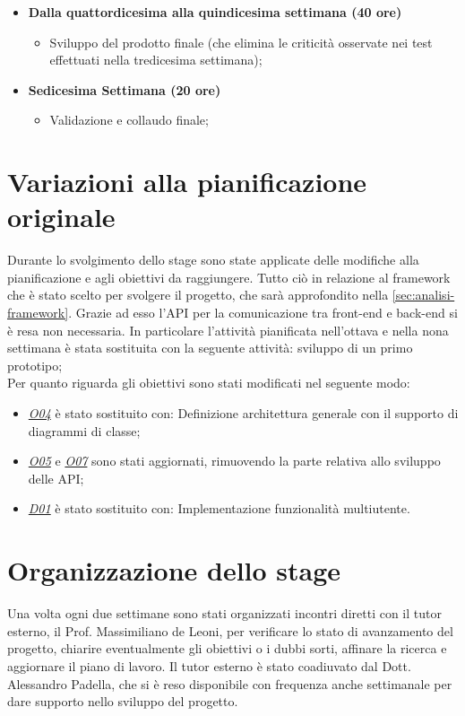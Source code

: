 \begin{itemize}
\begin{itemize}
	\end{itemize}
        
        
        \item[] \textbf{Dalla quattordicesima alla quindicesima settimana (40 ore)} 
        
	\begin{itemize}
            	\item{Sviluppo del prodotto finale (che elimina le criticità osservate nei test effettuati nella tredicesima settimana)};

	\end{itemize}

         \item[] \textbf{Sedicesima Settimana (20 ore)}   
	\begin{itemize}
            	\item{Validazione e collaudo finale};
	\end{itemize} 

 \end{itemize}


\section{Variazioni alla pianificazione originale}
Durante lo svolgimento dello stage sono state applicate delle modifiche alla pianificazione e agli obiettivi da raggiungere. Tutto ciò in relazione al framework che è stato scelto per svolgere il progetto, che sarà approfondito nella \autoref{sec:analisi-framework}. Grazie ad esso l'\gls{API} per la comunicazione tra front-end e back-end si è resa non necessaria.
In particolare l'attività pianificata nell'ottava e nella nona settimana è stata sostituita con la seguente attività: sviluppo di un primo prototipo;
\\
Per quanto riguarda gli obiettivi sono stati modificati nel seguente modo:
	\begin{itemize}
    \item \underline{\textit{O04}} è stato sostituito con: Definizione architettura generale con il supporto di diagrammi di classe;
    \item \underline{\textit{O05}} e \underline{\textit{O07}} sono stati aggiornati, rimuovendo la parte relativa allo sviluppo delle \gls{API};
    \item \underline{\textit{D01}} è stato sostituito con: Implementazione funzionalità multiutente.
	\end{itemize}


\section{Organizzazione dello stage}
Una volta ogni due settimane sono stati organizzati incontri diretti con il tutor esterno, il Prof. Massimiliano de Leoni, per verificare lo stato di avanzamento del progetto, chiarire eventualmente gli obiettivi o i dubbi sorti, affinare la ricerca e aggiornare il piano di lavoro. Il tutor esterno è stato coadiuvato dal Dott. Alessandro Padella, che si è reso disponibile con frequenza anche settimanale per dare supporto nello sviluppo del progetto.



 


